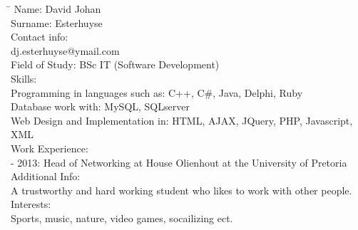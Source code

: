 \documentclass[12pt]{article}
\begin{document}
	\begin{tabbing}
		\hspace*{3.5cm}\=\hspace*{3cm} \kill
		Name:	\>David Johan\\
		Surname:	\> Esterhuyse \\
		Contact info:	 \\
			\> dj.esterhuyse@ymail.com \\
		Field of Study:	\> BSc IT (Software Development) \\
		Skills:	\\
			\>	Programming in languages such as: C++, C#, Java, Delphi, Ruby \\
			\>	Database work with: MySQL, SQLserver \\
			\>	Web Design and Implementation in: HTML, AJAX, JQuery, PHP, Javascript, XML \\
			Work Experience: \\
				 - 2013: Head of Networking at House Olienhout at the University of Pretoria \\
			Additional Info: \\
			\> A trustworthy and hard working student who likes to work with other people.\\
			Interests: \\
			\> Sports, music, nature, video games, socailizing ect. \\
		\end{tabbing}
	
	
\end{document}
